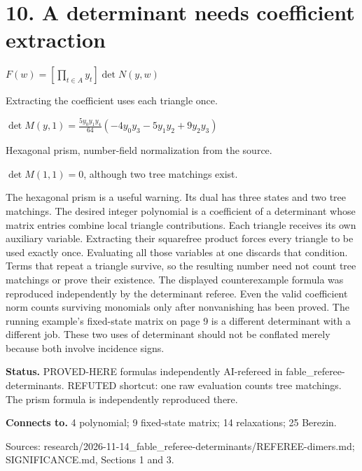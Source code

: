 \documentclass[10pt,a4paper]{amsart}
\begin{document}
\section*{10. A determinant needs coefficient extraction}
\begin{center}\begin{minipage}{.86\textwidth}\centering
\begin{minipage}{.97\linewidth}\centering
    $\displaystyle F(w)=[\prod_{t\in A}y_t]\det N(y,w)$
    \par\bigskip Extracting the coefficient uses each triangle once.
    \par\bigskip $\displaystyle\det M(y,1)=\frac{5y_0y_1y_4}{64}
    (-4y_0y_3-5y_1y_2+9y_2y_3)$
    \par\bigskip Hexagonal prism, number-field normalization from the source.
    \par $\det M(1,1)=0$, although two tree matchings exist.
    \end{minipage}
\end{minipage}\end{center}
The hexagonal prism is a useful warning. Its dual has three states and two tree matchings. The desired integer polynomial is a coefficient of a determinant whose matrix entries combine local triangle contributions. Each triangle receives its own auxiliary variable. Extracting their squarefree product forces every triangle to be used exactly once. Evaluating all those variables at one discards that condition. Terms that repeat a triangle survive, so the resulting number need not count tree matchings or prove their existence. The displayed counterexample formula was reproduced independently by the determinant referee. Even the valid coefficient norm counts surviving monomials only after nonvanishing has been proved. The running example's fixed-state matrix on page 9 is a different determinant with a different job. These two uses of determinant should not be conflated merely because both involve incidence signs.

\textbf{Status.} PROVED-HERE formulas independently AI-refereed in fable\_referee-determinants. REFUTED shortcut: one raw evaluation counts tree matchings. The prism formula is independently reproduced there.

\textbf{Connects to.} 4 polynomial; 9 fixed-state matrix; 14 relaxations; 25 Berezin.

{\footnotesize\raggedright Sources: research/\allowbreak{}2026-11-14\_fable\_referee-determinants/\allowbreak{}REFEREE-dimers.md;\allowbreak{} SIGNIFICANCE.md, Sections 1 and 3.\par}
\end{document}
